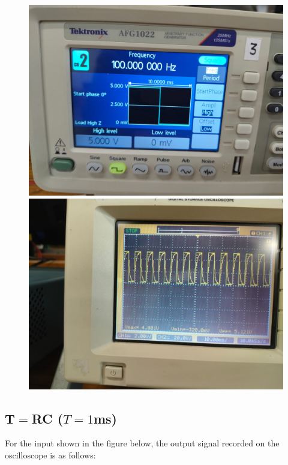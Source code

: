\documentclass[a4paper,12pt]{article}
\begin{document}
\begin{figure}[h]
    \centering
    \begin{minipage}{0.45\textwidth}
        \centering
        \includegraphics[width=\textwidth]{figs/C100para.jpeg}
    \end{minipage}\hfill
    \begin{minipage}{0.45\textwidth}
        \centering
        \includegraphics[width=\textwidth]{figs/C100plot.jpeg}
    \end{minipage}
\end{figure}



\subsection{T$=$RC ($T=1$ms)}
For the input shown in the figure below, the output signal recorded on the oscilloscope is as follows:
\end{document}
